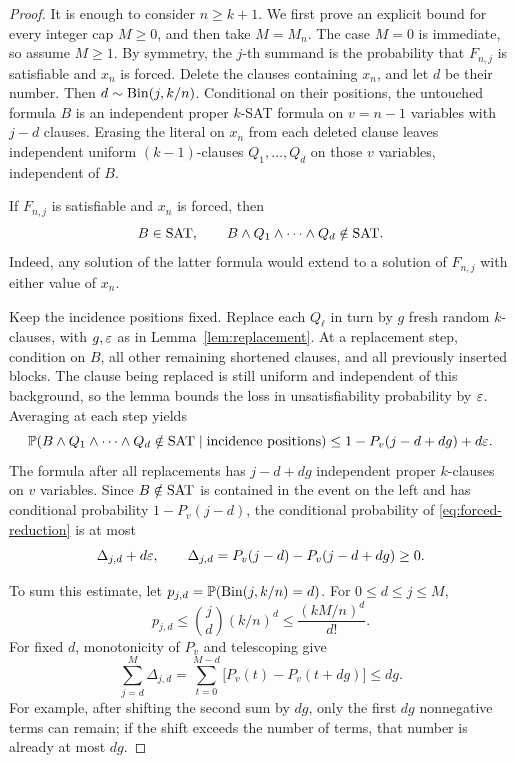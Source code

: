 \begin{proof}
It is enough to consider \(n\ge k+1\). We first prove an explicit
bound for every integer cap \(M\ge0\), and then take \(M=M_n\).
The case \(M=0\) is immediate, so assume \(M\ge1\).
By symmetry, the \(j\)-th
summand is the probability that \(F_{n,j}\) is satisfiable and \(x_n\)
is forced. Delete the clauses containing \(x_n\), and let \(d\) be
their number. Then \(d\sim\operatorname{Bin}(j,k/n)\). Conditional on their positions,
the untouched formula \(B\) is an independent proper \(k\)-SAT formula
on \(v=n-1\) variables with \(j-d\) clauses. Erasing the literal on
\(x_n\) from each deleted clause leaves independent uniform
\((k-1)\)-clauses \(Q_1,\ldots,Q_d\) on those \(v\) variables,
independent of \(B\).

If \(F_{n,j}\) is satisfiable and \(x_n\) is forced, then
\begin{equation}\label{eq:forced-reduction}
 B\in\mathrm{SAT},\qquad B\wedge Q_1\wedge\cdots\wedge Q_d\notin\mathrm{SAT}.
\end{equation}
Indeed, any solution of the latter formula would extend to a solution
of \(F_{n,j}\) with either value of \(x_n\).

Keep the incidence positions fixed. Replace each \(Q_\ell\) in turn by
\(g\) fresh random \(k\)-clauses, with \(g,\varepsilon\) as in
Lemma~\ref{lem:replacement}. At a replacement step, condition on \(B\),
all other remaining shortened clauses, and all previously inserted
blocks. The clause being replaced is still uniform and independent of
this background, so the lemma bounds the loss in unsatisfiability
probability by \(\varepsilon\). Averaging at each step yields
\[
 \mathbb P(B\wedge Q_1\wedge\cdots\wedge Q_d\notin\mathrm{SAT}
       \mid\text{incidence positions})
 \le1-P_v(j-d+dg)+d\varepsilon.
\]
The formula after all replacements has \(j-d+dg\) independent proper
\(k\)-clauses on \(v\) variables. Since \(B\notin\mathrm{SAT}\) is contained in
the event on the left and has conditional probability \(1-P_v(j-d)\),
the conditional probability of \eqref{eq:forced-reduction} is at most
\begin{equation}\label{eq:replacement-difference}
 \Delta_{j,d}+d\varepsilon,\qquad
 \Delta_{j,d}=P_v(j-d)-P_v(j-d+dg)\ge0.
\end{equation}

To sum this estimate, let
\(p_{j,d}=\mathbb P(\operatorname{Bin}(j,k/n)=d)\). For \(0\le d\le j\le M\),
\[
 p_{j,d}\le\binom jd(k/n)^d\le\frac{(kM/n)^d}{d!}.
\]
For fixed \(d\), monotonicity of \(P_v\) and telescoping give
\begin{equation}\label{eq:telescoping}
 \sum_{j=d}^{M}\Delta_{j,d}
 =\sum_{t=0}^{M-d}\bigl[P_v(t)-P_v(t+dg)\bigr]\le dg.
\end{equation}
For example, after shifting the second sum by \(dg\), only the first
\(dg\) nonnegative terms can remain; if the shift exceeds the number
of terms, that number is already at most \(dg\).


\end{proof}
